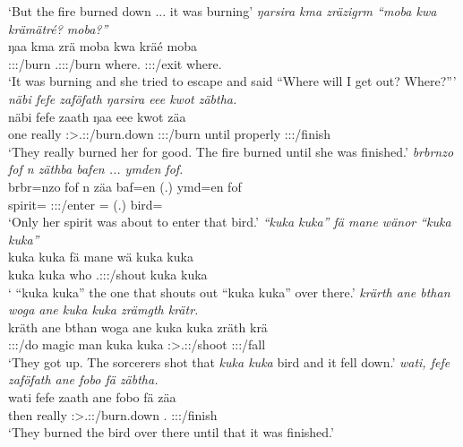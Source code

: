 \begin{exe}
	\trans `But the fire burned down ... it was burning'
	\emph{ŋarsira kma zräzigrm ``moba kwa krämätré? moba?''}\\
	\gll ŋaa kma zrä moba kwa kräé moba\\
	\Sg:\Sbj:\Pst:\Ipfv/burn {\Pot} \Tsg.\F:\Sbj:\Irr:\Pfv/burn where.{\Abl} {\Fut} \Fsg:\Sbj:\Irr:\Pfv/exit where.{\Abl}\\
	\trans `It was burning and she tried to escape and said ``Where will I get out? Where?'''
	\emph{näbi fefe zaföfath ŋarsira eee kwot zäbtha.}\\
	\gll näbi fefe zaath ŋaa eee kwot zäa\\
	one really \Stpl:\Sbj>\Tsg.\F:\Pst:\Pfv/burn.down \Sg:\Sbj:\Pst:\Ipfv/burn until properly \Sg:\Sbj:\Pst:\Pfv/finish\\
	\trans `They really burned her for good. The fire burned until she was finished.'
	\emph{brbrnzo fof n zäthba bafen ... ymden fof.}\\
	\gll brbr=nzo fof n zäa baf=en (.) ymd=en fof\\
	spirit={\Only} {\Emph} {\Imn} \Sg:\Sbj:\Pst:\Pfv/enter \Recog={\Loc} (.) bird={\Loc} \Emph\\
	\trans `Only her spirit was about to enter that bird.'
	\emph{``kuka kuka'' fä mane wänor ``kuka kuka''}\\
	\gll kuka kuka fä mane wä kuka kuka\\
	kuka kuka {\Dist} who \Tsg.\F:\Sbj:\Nonpast:\Ipfv/shout kuka kuka\\
	\trans ` ``kuka kuka'' the one that shouts out ``kuka kuka'' over there.'
	\emph{krärth ane bthan woga ane kuka kuka zrämgth krätr.}\\
	\gll kräth ane bthan woga ane kuka kuka zräth krä\\
	\Stpl:\Sbj:\Irr:\Pfv/do {\Dem} magic man {\Dem} kuka kuka \Stpl:\Sbj>\Tsg.\F:\Irr:\Pfv/shoot \Stsg:\Sbj:\Irr:\Pfv/fall\\
	\trans `They got up. The sorcerers shot that \emph{kuka kuka} bird and it fell down.'
	\emph{wati, fefe zaföfath ane fobo fä zäbtha.}\\
	\gll wati fefe zaath ane fobo fä zäa\\
	then really \Stpl:\Sbj>\Tsg.\F:\Pst:\Pfv/burn.down {\Dem} \Dist.{\All} {\Dist} \Sg:\Sbj:\Pst:\Pfv/finish\\
	\trans `They burned the bird  over there until that it was finished.'

\end{exe}
